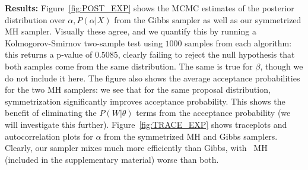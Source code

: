 \noindent \textbf{Results:}
Figure~\ref{fig:POST_EXP} shows the MCMC estimates of the posterior distribution over $\alpha, P(\alpha|X)$ from the Gibbs sampler as well as our symmetrized MH sampler. 
Visually these agree, and we quantify this by running a Kolmogorov-Smirnov two-sample test using $1000$ samples from each algorithm: this returns a p-value of $0.5085$, clearly failing to reject the null hypothesis that both samples come from the same distribution. 
The same is true for $\beta$, though we do not include it here.
The figure also shows the average acceptance probabilities for the two MH samplers: we see that for the same proposal distribution, symmetrization significantly improves acceptance probability. This shows the benefit of eliminating the $P(W|\theta)$ terms from the acceptance probability (we will investigate this further). Figure~\ref{fig:TRACE_EXP} shows traceplots and autocorrelation plots for $\alpha$ from the symmetrized MH and Gibbs samplers. Clearly, our sampler mixes much more efficiently than Gibbs, with \naive\ MH (included in the supplementary material) worse than both.


